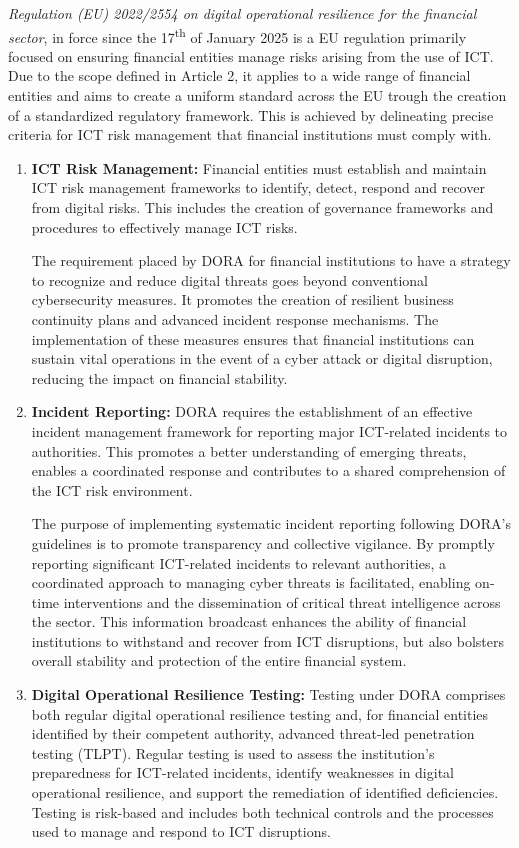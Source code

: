 \textit{Regulation (EU) 2022/2554 on digital operational resilience for
the financial sector}, in force since the 17\textsuperscript{th} of January 2025 is a \ac{EU} regulation primarily focused on ensuring financial entities manage risks arising from the use of \ac{ICT}. Due to the scope defined in Article 2, it applies to a wide range of financial entities and aims to create a uniform standard across the \ac{EU} trough the creation of a standardized regulatory framework\cite{doraT}. This is achieved by delineating precise criteria for \ac{ICT} risk management that financial institutions must comply with.

\begin{enumerate}
    \item \textbf{ICT Risk Management:}
    Financial entities must establish and maintain \ac{ICT} risk management frameworks to identify, detect, respond and recover from digital risks. This includes the creation of governance frameworks and procedures to effectively manage \ac{ICT} risks.

    The requirement placed by \ac{DORA} for financial institutions to have a strategy to recognize and reduce digital threats goes beyond conventional cybersecurity measures. It promotes the creation of resilient business continuity plans and advanced incident response mechanisms. The implementation of these measures ensures that financial institutions can sustain vital operations in the event of a cyber attack or digital disruption, reducing the impact on financial stability.\cite{doraT}
    \item \textbf{Incident Reporting:}
    \ac{DORA} requires the establishment of an effective incident management framework for reporting major \ac{ICT}-related incidents to authorities. This promotes a better understanding of emerging threats, enables a coordinated response and contributes to a shared comprehension of the \ac{ICT} risk environment. \cite{doraT}
    
    The purpose of implementing systematic incident reporting following \ac{DORA}'s guidelines is to promote transparency and collective vigilance. By promptly reporting significant \ac{ICT}-related incidents to relevant authorities, a coordinated approach to managing cyber threats is facilitated, enabling on-time interventions and the dissemination of critical threat intelligence across the sector. This information broadcast enhances the ability of financial institutions to withstand and recover from \ac{ICT} disruptions, but also bolsters overall stability and protection of the entire financial system.\cite{doraT}
    \item \textbf{Digital Operational Resilience Testing:}
    Testing under \ac{DORA} comprises both regular digital operational resilience testing and, for financial entities identified by their competent authority, advanced threat-led penetration testing (\ac{TLPT}). Regular testing is used to assess the institution's preparedness for \ac{ICT}-related incidents, identify weaknesses in digital operational resilience, and support the remediation of identified deficiencies. Testing is risk-based and includes both technical controls and the processes used to manage and respond to \ac{ICT} disruptions.\cite{doraT}


\end{enumerate}
